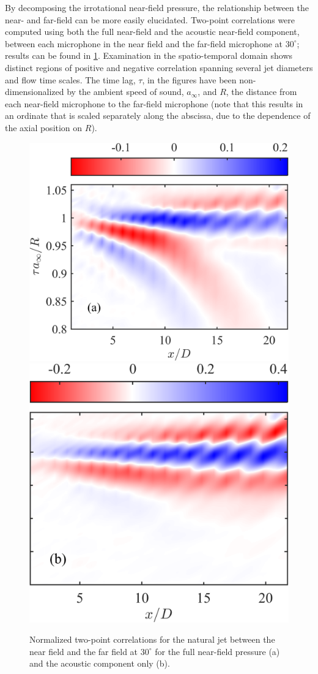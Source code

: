 By decomposing the irrotational near-field pressure, the relationship between the near- and far-field can be more easily elucidated. 
Two-point correlations were computed using both the full near-field and the acoustic near-field component, between each microphone in the near field and the far-field microphone at $30^\circ$; results can be found in \ref{fig:ch3_full_vs_partial_xcorr}. 
Examination in the spatio-temporal domain shows distinct regions of positive and negative correlation spanning several jet diameters and flow time scales.
The time lag, $\tau$, in the figures have been non-dimensionalized by the ambient speed of sound, $a_\infty$, and $R$, the distance from each near-field microphone to the far-field microphone (note that this results in an ordinate that is scaled separately along the abscissa, due to the dependence of the axial position on $R$).
\begin{figure}
	\centering
		\includegraphics[width=0.475\linewidth]{Figures/sect_nearfield_fullxcorr.png}
		\includegraphics[width=0.401\linewidth]{Figures/sect_nearfield_acousticxcorr.png}
	\caption{Normalized two-point correlations for the natural jet between the near field and the far field at $30^\circ$ for the full near-field pressure (a) and the acoustic component only (b).}
	\label{fig:ch3_full_vs_partial_xcorr}
\end{figure}

